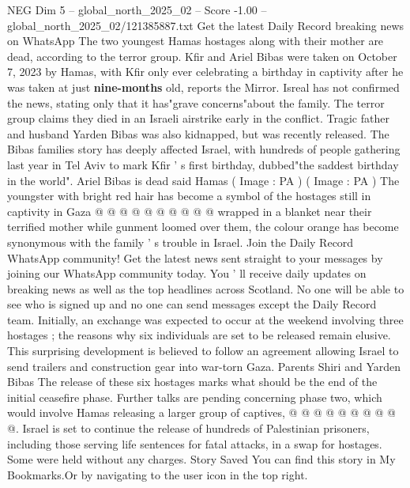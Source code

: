 \begin{textsample}{NEG Dim 5 – global\_north\_2025\_02 – Score -1.00 – global\_north\_2025\_02/121385887.txt}  \label{ex:f5_neg_241}
Get the latest Daily Record breaking news on WhatsApp The two youngest Hamas hostages along with their mother are dead, according to the terror group.
Kfir and Ariel Bibas were taken on October 7, 2023 by Hamas, with Kfir only ever celebrating a birthday in captivity after he was taken at just \textbf{nine-months} old, reports the Mirror.
Isreal has not confirmed the news, stating only that it has"grave concerns"about the family.
The terror group claims they died in an Israeli airstrike early in the conflict.
Tragic father and husband Yarden Bibas was also kidnapped, but was recently released.
The Bibas families story has deeply affected Israel, with hundreds of people gathering last year in Tel Aviv to mark Kfir ' s first birthday, dubbed"the saddest birthday in the world".
Ariel Bibas is dead said Hamas ( Image : PA ) ( Image : PA ) The youngster with bright red hair has become a symbol of the hostages still in captivity in Gaza @ @ @ @ @ @ @ @ @ @ wrapped in a blanket near their terrified mother while gunment loomed over them, the colour orange has become synonymous with the family ' s trouble in Israel.
Join the Daily Record WhatsApp community!
Get the latest news sent straight to your messages by joining our WhatsApp community today.
You ' ll receive daily updates on breaking news as well as the top headlines across Scotland.
No one will be able to see who is signed up and no one can send messages except the Daily Record team.
Initially, an exchange was expected to occur at the weekend involving three hostages ; the reasons why six individuals are set to be released remain elusive.
This surprising development is believed to follow an agreement allowing Israel to send trailers and construction gear into war-torn Gaza.
Parents Shiri and Yarden Bibas The release of these six hostages marks what should be the end of the initial ceasefire phase.
Further talks are pending concerning phase two, which would involve Hamas releasing a larger group of captives, @ @ @ @ @ @ @ @ @ @.
Israel is set to continue the release of hundreds of Palestinian prisoners, including those serving life sentences for fatal attacks, in a swap for hostages.
Some were held without any charges.
Story Saved You can find this story in My Bookmarks.Or by navigating to the user icon in the top right.

\end{textsample}
